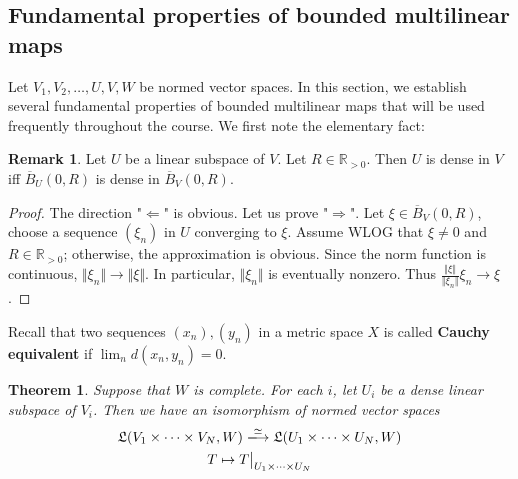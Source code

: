 \documentclass[12pt,b5paper,notitlepage]{article}
\theoremstyle{definition}
\newtheorem{rem}[df]{Remark}
\theoremstyle{plain}
\newtheorem{thm}[df]{Theorem}
\newcommand{\fk}{\mathfrak}
\newcommand{\ovl}{\overline}
\newcommand{\Rbb}{\mathbb R}
\numberwithin{equation}{section}
\begin{document}
\subsection{Fundamental properties of bounded multilinear maps}

Let $V_1,V_2,\dots,U,V,W$ be normed vector spaces. In this section, we establish several fundamental properties of bounded multilinear maps that will be used frequently throughout the course. We first note the elementary fact:

\begin{rem}\label{lb29}
Let $U$ be a linear subspace of $V$. Let $R\in\Rbb_{>0}$. Then $U$ is dense in $V$ iff $\ovl B_U(0,R)$ is dense in $\ovl B_V(0,R)$. 
\end{rem}

\begin{proof}
The direction "$\Leftarrow$" is obvious. Let us prove "$\Rightarrow$". Let $\xi\in\ovl B_V(0,R)$, choose a sequence $(\xi_n)$ in $U$ converging to $\xi$. Assume WLOG that $\xi\neq0$ and $R\in\Rbb_{>0}$; otherwise, the approximation is obvious. Since the norm function is continuous, $\Vert\xi_n\Vert\rightarrow\Vert\xi\Vert$. In particular, $\Vert\xi_n\Vert$ is eventually nonzero. Thus $\frac{\Vert\xi\Vert}{\Vert\xi_n\Vert}\xi_n\rightarrow \xi$.
\end{proof}

Recall that two sequences $(x_n),(y_n)$ in a metric space $X$ is called \textbf{Cauchy equivalent}  if $\lim_n d(x_n,y_n)=0$.


\begin{thm}\label{lb31}
Suppose that $W$ is complete. For each $i$, let $U_i$ be a dense linear subspace of $V_i$. Then we have an isomorphism of normed vector spaces
\begin{gather}\label{eq23}
\begin{gathered}
\fk L(V_1\times\cdots\times V_N,W)\xlongrightarrow{\simeq} \fk L(U_1\times\cdots\times U_N,W)\\
T\mapsto T\big|_{U_1\times\cdots\times U_N}
\end{gathered}
\end{gather}
\end{thm}
\end{document}
